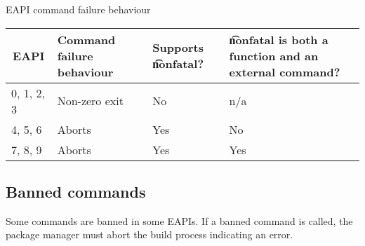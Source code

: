 \begin{centertable}{EAPI command failure behaviour}
    \label{tab:commands-die-table}
    \begin{tabular}{llll}
      \toprule
      \multicolumn{1}{c}{\textbf{EAPI}} &
      \multicolumn{1}{P{8em}}{\textbf{Command failure behaviour}} &
      \multicolumn{1}{P{5em}}{\textbf{Supports \t{nonfatal}?}} &
      \multicolumn{1}{P{12em}}{\textbf{\t{nonfatal} is both a function and an external command?}} \\
      \midrule
      0, 1, 2, 3        & Non-zero exit & No  & n/a \\
      4, 5, 6           & Aborts        & Yes & No  \\
      7, 8, 9           & Aborts        & Yes & Yes \\
      \bottomrule
    \end{tabular}
\end{centertable}

\subsection{Banned commands}
\label{sec:banned-commands}

 Some commands are banned in some EAPIs. If a banned command is
called, the package manager must abort the build process indicating an error.

